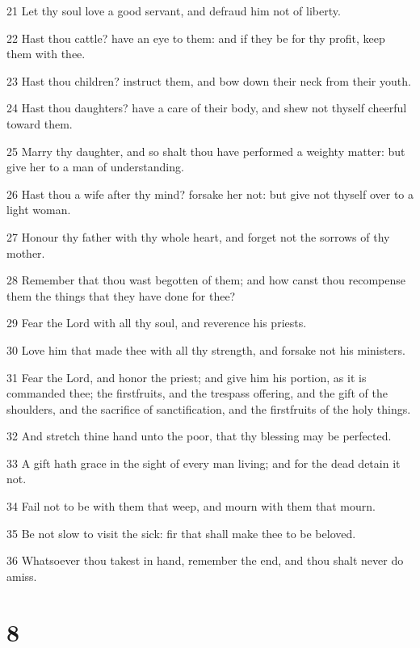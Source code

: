 \par 21 Let thy soul love a good servant, and defraud him not of liberty.
\par 22 Hast thou cattle? have an eye to them: and if they be for thy profit, keep them with thee.
\par 23 Hast thou children? instruct them, and bow down their neck from their youth.
\par 24 Hast thou daughters? have a care of their body, and shew not thyself cheerful toward them.
\par 25 Marry thy daughter, and so shalt thou have performed a weighty matter: but give her to a man of understanding.
\par 26 Hast thou a wife after thy mind? forsake her not: but give not thyself over to a light woman.
\par 27 Honour thy father with thy whole heart, and forget not the sorrows of thy mother.
\par 28 Remember that thou wast begotten of them; and how canst thou recompense them the things that they have done for thee?
\par 29 Fear the Lord with all thy soul, and reverence his priests.
\par 30 Love him that made thee with all thy strength, and forsake not his ministers.
\par 31 Fear the Lord, and honor the priest; and give him his portion, as it is commanded thee; the firstfruits, and the trespass offering, and the gift of the shoulders, and the sacrifice of sanctification, and the firstfruits of the holy things.
\par 32 And stretch thine hand unto the poor, that thy blessing may be perfected.
\par 33 A gift hath grace in the sight of every man living; and for the dead detain it not.
\par 34 Fail not to be with them that weep, and mourn with them that mourn.
\par 35 Be not slow to visit the sick: fir that shall make thee to be beloved.
\par 36 Whatsoever thou takest in hand, remember the end, and thou shalt never do amiss.

\chapter{8}

